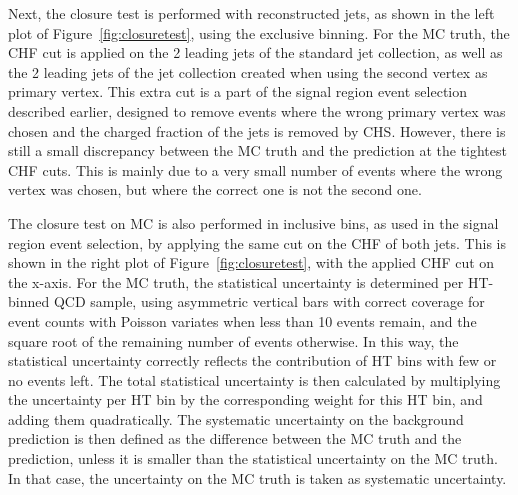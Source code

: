 Next, the closure test is performed with reconstructed jets, as shown in the left plot of Figure~\ref{fig:closuretest}, using the exclusive binning. For the MC truth, the CHF cut is applied on the 2 leading jets of the standard jet collection, as well as the 2 leading jets of the jet collection created when using the second vertex as primary vertex. This extra cut is a part of the signal region event selection described earlier, designed to remove events where the wrong primary vertex was chosen and the charged fraction of the jets is removed by \ac{CHS}. However, there is still a small discrepancy between the MC truth and the prediction at the tightest CHF cuts. This is mainly due to a very small number of events where the wrong vertex was chosen, but where the correct one is not the second one.

The closure test on MC is also performed in inclusive bins, as used in the signal region event selection, by applying the same cut on the CHF of both jets. This is shown in the right plot of Figure~\ref{fig:closuretest}, with the applied CHF cut on the x-axis. For the MC truth, the statistical uncertainty is determined  per HT-binned \acs{QCD} sample, using asymmetric vertical bars with correct coverage for event counts with Poisson variates when less than 10 events remain, and the square root of the remaining number of events otherwise. In this way, the statistical uncertainty correctly reflects the contribution of HT bins with few or no events left. The total statistical uncertainty is then calculated by multiplying the uncertainty per HT bin by the corresponding weight for this HT bin, and adding them quadratically. The systematic uncertainty on the background prediction is then defined as the difference between the MC truth and the prediction, unless it is smaller than the statistical uncertainty on the MC truth. In that case, the uncertainty on the MC truth is taken as systematic uncertainty.

